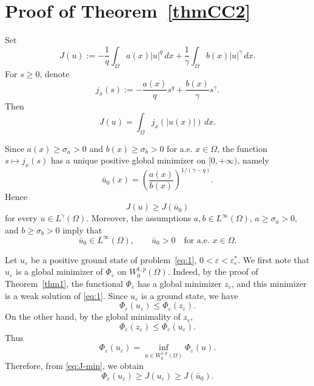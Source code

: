 \documentclass[preprint,11pt]{elsarticle}
\numberwithin{equation}{section}
\begin{document}

\section{Proof of Theorem~\ref{thmCC2}}

Set
\[
J(u):=
-\frac1q\int_\Omega a(x)|u|^q\,dx
+
\frac1\gamma\int_\Omega b(x)|u|^\gamma\,dx .
\]
For \(s\ge0\), denote
\[
j_x(s):=
-\frac{a(x)}q s^q+\frac{b(x)}\gamma s^\gamma .
\]
Then
\[
J(u)=\int_\Omega j_x(|u(x)|)\,dx .
\]

Since \(a(x)\ge\sigma_a>0\) and \(b(x)\ge\sigma_b>0\) for a.e.
\(x\in\Omega\), the function \(s\mapsto j_x(s)\) has a unique positive
global minimizer on \([0,+\infty)\), namely
\[
\bar u_0(x)
=
\left(\frac{a(x)}{b(x)}\right)^{1/(\gamma-q)} .
\]
Hence
\begin{equation}\label{eq:J-min}
	J(u)\ge J(\bar u_0)
\end{equation}
for every \(u\in L^\gamma(\Omega)\). Moreover, the assumptions
\(a,b\in L^\infty(\Omega)\), \(a\ge\sigma_a>0\), and
\(b\ge\sigma_b>0\) imply that
\[
\bar u_0\in L^\infty(\Omega),
\qquad
\bar u_0>0
\quad\text{for a.e. }x\in\Omega .
\]

Let \(u_\varepsilon\) be a positive ground state of problem~\eqref{eq:1},
\(0<\varepsilon<\varepsilon_e^*\). We first note that
\(u_\varepsilon\) is a global minimizer of \(\Phi_\varepsilon\) on
\(W^{1,p}_0(\Omega)\). Indeed, by the proof of Theorem~\ref{thm1}, the
functional \(\Phi_\varepsilon\) has a global minimizer \(z_\varepsilon\),
and this minimizer is a weak solution of \eqref{eq:1}. Since
\(u_\varepsilon\) is a ground state, we have
\[
\Phi_\varepsilon(u_\varepsilon)
\le
\Phi_\varepsilon(z_\varepsilon).
\]
On the other hand, by the global minimality of \(z_\varepsilon\),
\[
\Phi_\varepsilon(z_\varepsilon)
\le
\Phi_\varepsilon(u_\varepsilon).
\]
Thus
\[
\Phi_\varepsilon(u_\varepsilon)
=
\inf_{u\in W^{1,p}_0(\Omega)}\Phi_\varepsilon(u).
\]
Therefore, from \eqref{eq:J-min}, we obtain
\begin{equation}\label{eq:lower-energy}
	\Phi_\varepsilon(u_\varepsilon)
	\ge
	J(u_\varepsilon)
	\ge
	J(\bar u_0).
\end{equation}
\end{document}

